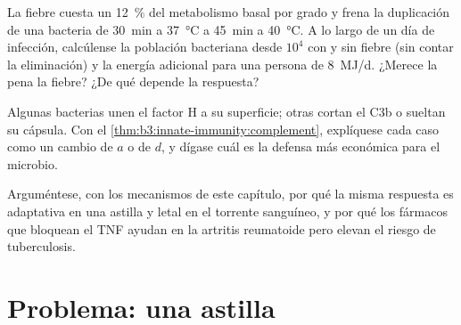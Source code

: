 \begin{exercise}[$\star\star\star$]\label{exo:b3:innate-immunity:10}
La fiebre cuesta un \qty{12}{\%} del metabolismo basal por grado y frena
la duplicación de una bacteria de \qty{30}{min} a \qty{37}{\celsius} a
\qty{45}{min} a \qty{40}{\celsius}. A lo largo de un día de infección,
calcúlense la población bacteriana desde $10^{4}$ con y sin fiebre (sin
contar la eliminación) y la energía adicional para una persona de
\qty{8}{MJ/d}. ¿Merece la pena la fiebre? ¿De qué depende la respuesta?
\end{exercise}

\begin{exercise}[$\star\star\star$]\label{exo:b3:innate-immunity:11}
Algunas bacterias unen el factor H a su superficie; otras cortan el C3b o
sueltan su cápsula. Con el \cref{thm:b3:innate-immunity:complement},
explíquese cada caso como un cambio de $a$ o de $d$, y dígase cuál es la
defensa más económica para el microbio.
\end{exercise}

\begin{exercise}[$\star\star\star$]\label{exo:b3:innate-immunity:12}
Arguméntese, con los mecanismos de este capítulo, por qué la misma
respuesta es adaptativa en una astilla y letal en el torrente sanguíneo,
y por qué los fármacos que bloquean el TNF ayudan en la artritis
reumatoide pero elevan el riesgo de tuberculosis.
\end{exercise}

\section{Problema: una astilla}


